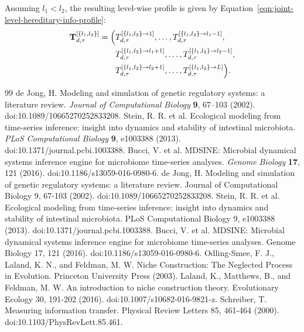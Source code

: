 \documentclass[11pt]{article}
\begin{document}
Assuming $l_1<l_2$, the resulting level-wise profile is given by Equation~\ref{eqn:joint-level-hereditary-info-profile}:
\begin{equation}
\label{eqn:joint-level-hereditary-info-profile}
\begin{aligned}
\mathbf{T}^{[\{l_1,l_2\}]}_{d,\tau}
=
\Bigl(
& T^{[\{l_1,l_2\} \to 1]}_{d,\tau},
\ldots,
T^{[\{l_1,l_2\} \to l_1-1]}_{d,\tau},
\\
& T^{[\{l_1,l_2\} \to l_1+1]}_{d,\tau},
\ldots,
T^{[\{l_1,l_2\} \to l_2-1]}_{d,\tau},
\\
& T^{[\{l_1,l_2\} \to l_2+1]}_{d,\tau},
\ldots,
T^{[\{l_1,l_2\} \to L]}_{d,\tau}
\Bigr).
\end{aligned}
\end{equation}
\begin{thebibliography}{99}
de Jong, H.
Modeling and simulation of genetic regulatory systems: a literature review.
\textit{Journal of Computational Biology} \textbf{9}, 67--103 (2002).
doi:10.1089/10665270252833208.
Stein, R. R. et al.
Ecological modeling from time-series inference: insight into dynamics and stability of intestinal microbiota.
\textit{PLoS Computational Biology} \textbf{9}, e1003388 (2013).
doi:10.1371/journal.pcbi.1003388.
Bucci, V. et al.
MDSINE: Microbial dynamical systems inference engine for microbiome time-series analyses.
\textit{Genome Biology} \textbf{17}, 121 (2016).
doi:10.1186/s13059-016-0980-6.
 de Jong, H. Modeling and simulation of genetic regulatory systems: a literature review. Journal of Computational Biology 9, 67-103 (2002). doi:10.1089/10665270252833208.
 Stein, R. R. et al. Ecological modeling from time-series inference: insight into dynamics and stability of intestinal microbiota. PLoS Computational Biology 9, e1003388 (2013). doi:10.1371/journal.pcbi.1003388.
 Bucci, V. et al. MDSINE: Microbial dynamical systems inference engine for microbiome time-series analyses. Genome Biology 17, 121 (2016). doi:10.1186/s13059-016-0980-6.
 Odling-Smee, F. J., Laland, K. N., and Feldman, M. W. Niche Construction: The Neglected Process in Evolution. Princeton University Press (2003).
 Laland, K., Matthews, B., and Feldman, M. W. An introduction to niche construction theory. Evolutionary Ecology 30, 191-202 (2016). doi:10.1007/s10682-016-9821-z.
 Schreiber, T. Measuring information transfer. Physical Review Letters 85, 461-464 (2000). doi:10.1103/PhysRevLett.85.461.

\end{thebibliography}
\end{document}
